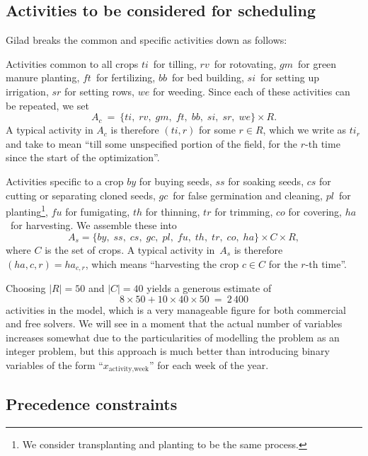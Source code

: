 \documentclass[11pt,reqno]{amsart}
\numberwithin{equation}{section}
\begin{document}
\subsection{Activities to be considered for scheduling}

Gilad breaks the common and specific activities down as follows:

\begin{mydesc}
\item[Activities common to all crops] $ti$~for tilling, $rv$~for rotovating, $gm$~for
  green manure planting, $f\!t$~for fertilizing, $bb$~for bed building, $si$~for setting
  up irrigation, $sr$ for setting rows, $we$ for weeding. Since each of these activities
  can be repeated, we set
  \[
     A_c 
     \ = \
     \{ ti,\;rv,\;gm,\;f\!t,\;bb,\;si,\;sr,\;we\} \times R.
  \]
  A typical activity in $A_c$ is therefore $(ti,r)$ for some $r\in R$, which we write as
  $ti_{r}$ and take to mean ``till some unspecified portion of the field, for the $r$-th
  time since the start of the optimization''.


\item[Activities specific to a crop] $by$ for buying seeds, $ss$ for soaking seeds, $cs$
  for cutting or separating cloned seeds, $gc$~for false germination and cleaning,
  $pl$~for planting\footnote{We consider transplanting and planting to be the same
    process.}, $f\!u$ for fumigating, $th$ for thinning, $tr$ for
  trimming, $co$ for covering, $ha$~for harvesting. We assemble these into
  \[
     A_s = \{ by,\;ss,\;cs,\;gc,\;pl,\;f\!u,\;th,\;tr,\;co,\;ha\} \times C\times R,
  \]
  where $C$ is the set of crops. A typical activity in~$A_s$ is
  therefore $(ha,c, r)=ha_{c,r}$, which means ``harvesting the crop
  $c\in C$ for the $r$-th time''.
\end{mydesc}

Choosing $|R|=50$ and $|C|=40$ yields a generous estimate of
\[
    8\times 50 + 10\times 40 \times 50
    \ = \
    2\,400
\]
activities in the model, which is a very manageable figure for both commercial and free
solvers. We will see in a moment that the actual number of variables increases somewhat
due to the particularities of modelling the problem as an integer problem, but this
approach is much better than introducing binary variables of the form
``$x_{\text{activity}, \text{week}}$'' for each week of the year.



\subsection{Precedence constraints}
\end{document}
